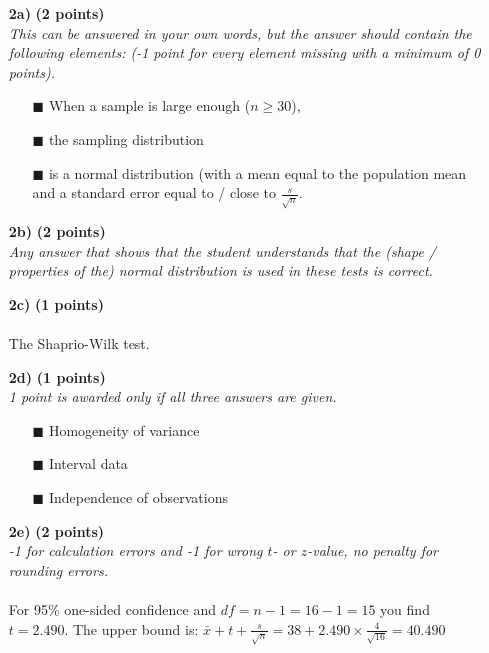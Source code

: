 \begin{itemize}
\item[\textbf{2a)}] \textbf{(2 points)} \\
     \textit{This can be answered in your own words, but the answer should contain the following elements: (-1 point for every element missing with a minimum of 0 points).} \\
    \begin{itemize}
        \item[$\blacksquare$] When a sample is large enough ($n \geq 30$),        
        \item[$\blacksquare$] the sampling distribution
        \item[$\blacksquare$] is a normal distribution (with a mean equal to the population mean and a standard error equal to / close to $\frac{s}{\sqrt{n}}$.
    \end{itemize}
\item[\textbf{2b)}] \textbf{(2 points)} \\
     \textit{Any answer that shows that the student understands that the (shape / properties of the) normal distribution is used in these tests is correct.}
\item[\textbf{2c)}] \textbf{(1 points)} \\ \\
     The Shaprio-Wilk test. \\
\item[\textbf{2d)}] \textbf{(1 points)} \\
     \textit{1 point is awarded only if all three answers are given.} \\
    \begin{itemize}
        \item[$\blacksquare$] Homogeneity of variance
        \item[$\blacksquare$] Interval data
        \item[$\blacksquare$] Independence of observations
    \end{itemize}
\item[\textbf{2e)}] \textbf{(2 points)} \\
     \textit{-1 for calculation errors and -1 for wrong $t$- or $z$-value, no penalty for rounding errors.} \\ 
     \\
     For 95\% one-sided confidence and $df = n - 1 = 16 - 1 = 15$ you find $t = 2.490$. The upper bound is: $\bar{x} + t + \frac{s}{\sqrt{n}} = 38 + 2.490 \times \frac{4}{\sqrt{16}} = 40.490$ \\

\end{itemize}
